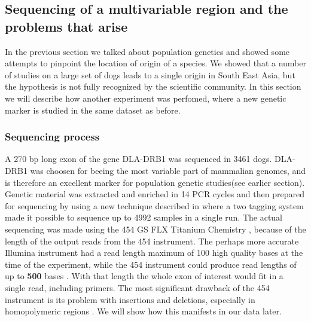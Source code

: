 \subsection{Sequencing of a multivariable region and the problems that arise}

In the previous section we talked about population genetics and showed some attempts to pinpoint the location of origin of a species. We showed that a number of studies on a large set of dogs leads to a single origin in South East Asia, but the hypothesis is not fully recognized by the scientific community. In this section we will describe how another experiment was perfomed, where a new genetic marker is studied in the same dataset as before.\\

\subsubsection{Sequencing process}

A 270 bp long exon of the gene DLA-DRB1 was sequenced in 3461 dogs. DLA-DRB1 was choosen for beeing the most variable part of mammalian genomes, and is therefore an excellent marker for population genetic studies(see earlier section). Genetic material was extracted and enriched in 14 PCR cycles and then prepared for sequencing by using a new technique described in \cite{neiman11} where a two tagging system made it possible to sequence up to 4992 samples in a single run. The actual sequencing was made using the 454 GS FLX Titanium Chemistry \cite{454_tech}, because of the length of the output reads from the 454 instrument. The perhaps more accurate Illumina instrument had a read length maximum of 100 high quality bases \cite{NextGen} at the time of the experiment, while the 454 instrument could produce read lengths of up to \textbf{500} bases \cite{454_problems}. With that length the whole exon of interest would fit in a single read, including primers. The most significant drawback of the 454 instrument is its problem with insertions and deletions, especially in homopolymeric regions \cite{454_problems}. We will show how this manifests in our data later.\\


